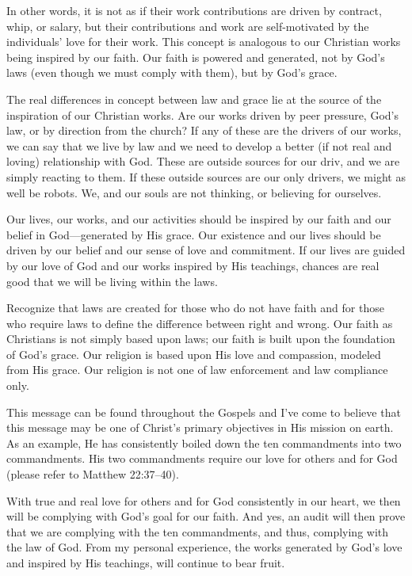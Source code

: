 \documentclass[12pt]{memoir}
\begin{document}
In other words, it is not as if their work contributions
are driven by contract, whip, or salary, but their contributions
and work are self-motivated by the individuals' love for their work.
This concept is analogous to our Christian works being inspired
by our faith. Our faith is powered and generated, not by God's laws (even though we must comply with them), but by God's grace. 

The real differences in concept between law and grace lie at the
source of the inspiration of our Christian works. Are our works driven
by peer pressure, God's law, or by direction from the church? If any
of these are the drivers of our works, we can say that we live by law and we need to develop a better (if not real and loving) relationship with God. These are outside sources for our driv, and we are simply reacting to them. If these outside sources are our only drivers,
we might as well be robots. We, and our souls are not thinking, or believing for ourselves.

Our lives, our works, and our activities should be inspired by our
faith and our belief in God---generated by His grace. Our existence
and our lives should be driven by our belief and our sense of love
and commitment. If our lives are guided by our love of God and our
works inspired by His teachings, chances are real good that
we will be living within the laws. 

Recognize that laws are created for those who do not have faith and
for those who require laws to define the difference between right
and wrong. Our faith as Christians is not simply based upon laws; our faith is built upon the foundation of God's grace. Our religion is based upon His love and compassion, modeled from His grace. Our religion is not one of law enforcement and law compliance only. 

This message can be found throughout the Gospels and I've come to
believe that this message may be one of Christ's primary objectives
in His mission on earth. As an example, He has consistently boiled
down the ten commandments into two commandments. His two commandments
require our love for others and for God (please refer to Matthew 22:37--40).

With true and real love for others and for God consistently
in our heart, we then will be complying with God's goal for our faith.
And yes, an audit will then prove that we are complying with the ten
commandments, and thus, complying with the law of God. From my personal experience, the works generated by God's love and inspired by His
teachings, will continue to bear fruit.
\end{document}
